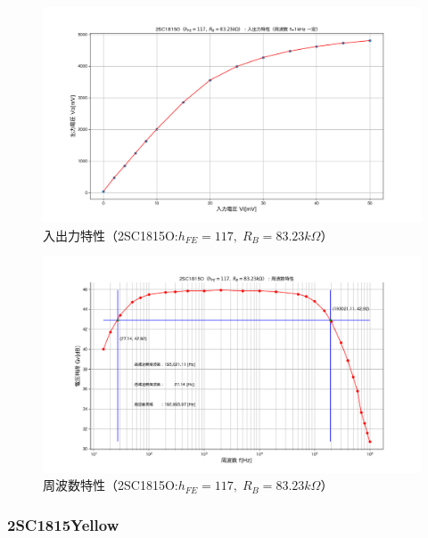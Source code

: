 \documentclass[uplatex,a4paper,11pt,oneside,openany]{jsbook}
\begin{document}
\newpage

  \begin{figure}[H]
    \centering
     \includegraphics[keepaspectratio, scale=0.48, angle=0]
                 {figs/png/iocharM1O.png}
                 \caption{入出力特性（2SC1815O:$h_{FE}=117,\;R_B=83.23k\Omega$）}
                 \label{fig:iocharM1O}
 \end{figure}

 \begin{figure}[H]
    \centering
     \includegraphics[keepaspectratio, scale=0.48, angle=0]
               {figs/png/freqcharM1O.png}
               \caption{周波数特性（2SC1815O:$h_{FE}=117,\;R_B=83.23k\Omega$）}
               \label{fig:freqcharM1O}
 \end{figure}

\newpage

\subsubsection{2SC1815Yellow}
\end{document}
